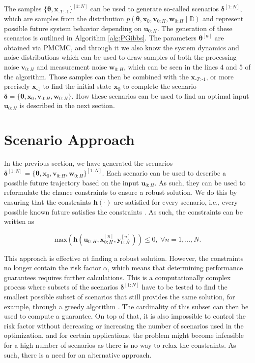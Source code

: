 The samples $\{\boldsymbol{\theta}, \boldsymbol{x}_{\text{-}T:\text{-}1}\}^{[1:N]}$ can be used to generate so-called scenarios $\boldsymbol{\delta}^{[1:N]}$, which are samples from the distribution $p(\boldsymbol{\theta}, \boldsymbol{x}_0, \boldsymbol{v}_{0:H}, \boldsymbol{w}_{0:H} \mid \mathbb{D})$ and represent possible future system behavior depending on $\boldsymbol{u}_{0:H}$. The generation of these scenarios is outlined in Algorithm \ref{alg:PGibbs}. The parameters $\boldsymbol{\theta}^{[n]}$ are obtained via PMCMC, and through it we also know the system dynamics and noise distributions which can be used to draw samples of both the processing noise $\boldsymbol{v}_{0:H}$ and measurement noise $\boldsymbol{w}_{0:H}$, which can be seen in the lines 4 and 5 of the algorithm. Those samples can then be combined with the $\boldsymbol{x}_{\text{-}T:\text{-}1}$, or more precisely $\boldsymbol{x}_{\text{-}1}$ to find the initial state $\boldsymbol{x}_{0}$ to complete the scenario $\boldsymbol{\delta} = \{ \boldsymbol{\theta}, \boldsymbol{x}_0, \boldsymbol{v}_{0:H}, \boldsymbol{w}_{0:H}\}$. How these scenarios can be used to find an optimal input $\boldsymbol{u}_{0:H}$ is described in the next section.


\section{Scenario Approach} \label{Scenario Approach}

In the previous section, we have generated the scenarios $ \boldsymbol{\delta}^{[1:N]} = \{ \boldsymbol{\theta}, \boldsymbol{x}_0, \boldsymbol{v}_{0:H}, \boldsymbol{w}_{0:H}\}^{[1:N]}$. Each scenario can be used to describe a possible future trajectory based on the input $\boldsymbol{u}_{0:H}$. As such, they can be used to reformulate the chance constraints to ensure a robust solution. We do this by ensuring that the constraints $\boldsymbol{h}(\cdot)$ are satisfied for every scenario, i.e., every possible known future satisfies the constraints \cite{Garatti_22}. As such, the constraints can be written as

\begin{equation}
	 \text{max}(\boldsymbol{h}(\boldsymbol{u}_{0:H},  \boldsymbol{x}_{0:H}^{[n]},  \boldsymbol{y}_{0:H}^{[n]})) \leq 0, \; \forall n = 1, ..., N .
\end{equation}

This approach is effective at finding a robust solution. However, the constraints no longer contain the risk factor $\alpha$, which means that determining performance guarantees requires further calculations. This is a computationally complex process where subsets of the scenarios $\boldsymbol{\delta}^{[1:N]}$ have to be tested to find the smallest possible subset of scenarios that still provides the same solution, for example, through a greedy algorithm \cite{Garatti_21}. The cardinality of this subset can then be used to compute a guarantee. On top of that, it is also impossible to control the risk factor without decreasing or increasing the number of scenarios used in the optimization, and for certain applications, the problem might become infeasible for a high number of scenarios as there is no way to relax the constraints. As such, there is a need for an alternative approach. 